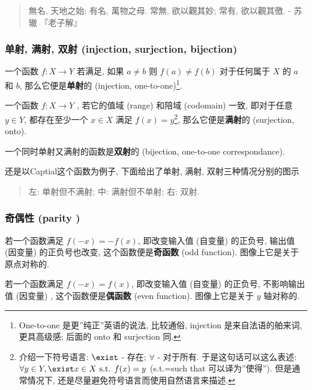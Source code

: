 \begin{quote}
無名, 天地之始; 有名, 萬物之母. 常無, 欲以觀其妙; 常有, 欲以觀其徼. -
苏辙 『老子解』
\end{quote}

\hypertarget{ux5355ux5c04-ux6ee1ux5c04-ux53ccux5c04-injection-surjection-bijection}{%
\subsubsection{单射, 满射, 双射 (injection, surjection,
bijection)}\label{ux5355ux5c04-ux6ee1ux5c04-ux53ccux5c04-injection-surjection-bijection}}

一个函数 \(f:X\rightarrow Y\) 若满足, 如果 \(a\neq b\) 则
\(f(a)\neq f(b)\) 对于任何属于 \(X\) 的 \(a\) 和 \(b\),
那么它便是\textbf{单射}的 (injection, one-to-one)\footnote{One-to-one
  是更''纯正''英语的说法, 比较通俗, injection 是来自法语的舶来词,
  更具高级感; 后面的 onto 和 surjection 同.}.

一个函数 \(f:X\rightarrow Y\) , 若它的值域 (range) 和陪域 (codomain)
一致, 即对于任意 \(y\in Y\), 都存在至少一个 \(x\in X\) 满足
\(f(x)=y\)\footnote{介绍一下符号语言: \(\exist\) - 存在; \(\forall\) -
  对于所有. 于是这句话可以这么表述:
  \(\forall y\in Y, \exist x\in X \text{ s.t. } f(x)=y\) (s.t.=such that
  可以译为''使得''). 但是通常情况下,
  还是尽量避免符号语言而使用自然语言来描述.}, 那么它便是\textbf{满射}的
(surjection, onto).

一个同时单射又满射的函数是\textbf{双射}的 (bijection, one-to-one
correspondance).

还是以Captial这个函数为例子, 下面给出了单射, 满射,
双射三种情况分别的图示

\begin{quote}
左: 单射但不满射; 中: 满射但不单射; 右: 双射.
\end{quote}

\hypertarget{ux5947ux5076ux6027-parity}{%
\subsubsection{\texorpdfstring{奇偶性 (parity
\doge)}{奇偶性 (parity )}}\label{ux5947ux5076ux6027-parity}}

若一个函数满足 \(f(-x)=-f(x)\), 即改变输入值 (自变量) 的正负号, 输出值
(因变量) 的正负号也改变, 这个函数便是\textbf{奇函数} (odd function).
图像上它是关于原点对称的.

若一个函数满足 \(f(-x)=f(x)\), 即改变输入值 (自变量) 的正负号,
不影响输出值 (因变量) , 这个函数便是\textbf{偶函数} (even function).
图像上它是关于 \(y\) 轴对称的.

